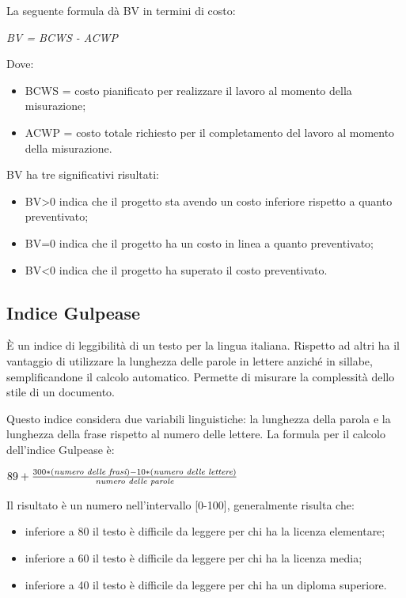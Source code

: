   La seguente formula dà BV in termini di costo:
  \begin{center}
    \emph{BV = BCWS - ACWP}
  \end{center}
  Dove:
  \begin{itemize}
    \item BCWS = costo pianificato per realizzare il lavoro al momento della misurazione;
    \item ACWP = costo totale richiesto per il completamento del lavoro al momento della misurazione.
  \end{itemize}
  BV ha tre significativi risultati:
  \begin{itemize}
    \item BV>0 indica che il progetto sta avendo un costo inferiore rispetto a quanto preventivato;
    \item BV=0 indica che il progetto ha un costo in linea a quanto preventivato;
    \item BV<0 indica che il progetto ha superato il costo preventivato.
  \end{itemize}

  \subsection{Indice Gulpease}
  È un indice di leggibilità di un testo per la lingua italiana.
Rispetto ad altri ha il vantaggio di utilizzare la lunghezza delle parole in lettere anziché in sillabe, semplificandone il calcolo automatico. Permette di misurare la complessità dello stile di un documento.

  Questo indice considera due variabili linguistiche: la lunghezza della parola e la lunghezza della frase rispetto al numero delle lettere.
  La formula per il calcolo dell'indice Gulpease è:
  \begin{center}
    \( 89+\frac{300 * (\emph{numero delle frasi}) - 10 * (\emph{numero delle lettere})}{\emph{numero delle parole}} \)
  \end{center}
  Il risultato è un numero nell'intervallo [0-100], generalmente risulta che:
  \begin{itemize}
    \item inferiore a 80 il testo è difficile da leggere per chi ha la licenza elementare;
    \item inferiore a 60 il testo è difficile da leggere per chi ha la licenza media;
    \item inferiore a 40 il testo è difficile da leggere per chi ha un diploma superiore.
  \end{itemize}

